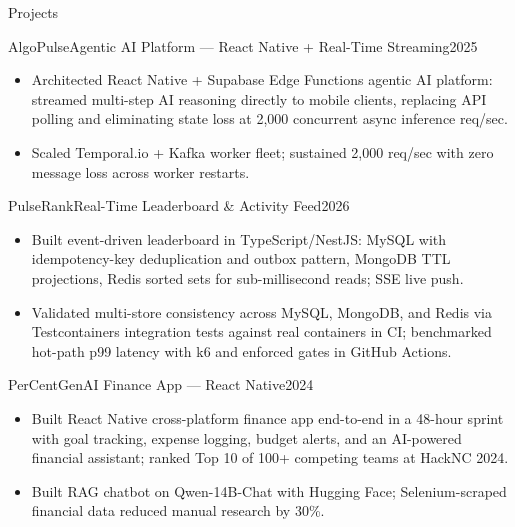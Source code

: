 \documentclass[]{mcdowellcv}
\begin{document}
\begin{cvsection}{Projects}
  \begin{cvsubsection}{AlgoPulse}{Agentic AI Platform --- React Native + Real-Time Streaming}{2025}
    \begin{itemize}
      \item Architected React Native + Supabase Edge Functions agentic AI platform: streamed multi-step AI reasoning directly to mobile clients, replacing API polling and eliminating state loss at 2,000 concurrent async inference req/sec.
      \item Scaled Temporal.io + Kafka worker fleet; sustained 2,000 req/sec with zero message loss across worker restarts.
    \end{itemize}
    \vspace{-1.5pt}
  \end{cvsubsection}

  \begin{cvsubsection}{PulseRank}{Real-Time Leaderboard \& Activity Feed}{2026}
    \begin{itemize}
      \item Built event-driven leaderboard in TypeScript/NestJS: MySQL with idempotency-key deduplication and outbox pattern, MongoDB TTL projections, Redis sorted sets for sub-millisecond reads; SSE live push.
      \item Validated multi-store consistency across MySQL, MongoDB, and Redis via Testcontainers integration tests against real containers in CI; benchmarked hot-path p99 latency with k6 and enforced gates in GitHub Actions.
    \end{itemize}
    \vspace{-1.5pt}
  \end{cvsubsection}

  \begin{cvsubsection}{PerCent}{GenAI Finance App --- React Native}{2024}
    \begin{itemize}
      \item Built React Native cross-platform finance app end-to-end in a 48-hour sprint with goal tracking, expense logging, budget alerts, and an AI-powered financial assistant; ranked Top 10 of 100+ competing teams at HackNC 2024.
      \item Built RAG chatbot on Qwen-14B-Chat with Hugging Face; Selenium-scraped financial data reduced manual research by 30\%.
    \end{itemize}
  \end{cvsubsection}
\end{cvsection}
\end{document}
